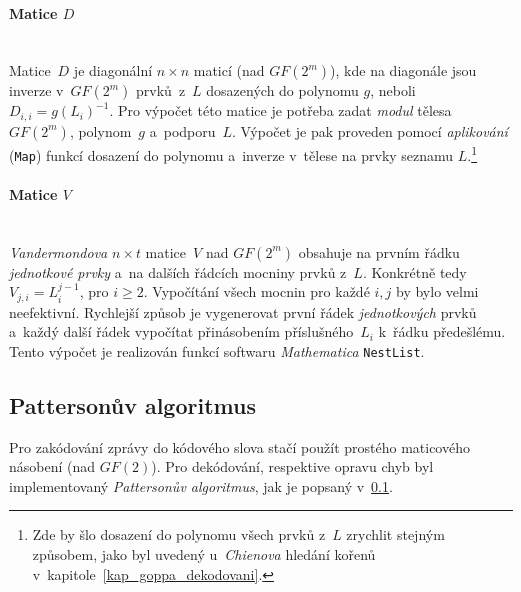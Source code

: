 \documentclass[thesis=M,czech,hidelinks]{FITthesis}[2012/06/26]
\newcommand{\0}{{\textcolor[gray]{0.75}{0}}}
\begin{document}
\paragraph{Matice $D$} \hfil \\
Matice~$D$ je diagonální $n \times n$ maticí (nad $GF(2^m)$), kde na diagonále
jsou inverze v~$GF(2^m)$ prvků~z~$L$ dosazených do polynomu $g$, neboli $D_{i,i}
= g(L_i)^{-1}$. Pro výpočet této matice je potřeba zadat \emph{modul} tělesa
$GF(2^m)$, polynom~$g$ a~podporu~$L$. Výpočet je pak proveden pomocí
\emph{aplikování} (\texttt{Map}) funkcí dosazení do polynomu a~inverze
v~tělese na prvky seznamu $L$.\footnote{
    Zde by šlo dosazení do polynomu všech prvků z~$L$ zrychlit stejným způsobem,
    jako byl uvedený u~\emph{Chienova} hledání kořenů
    v~kapitole~\ref{kap_goppa_dekodovani}.
}


\paragraph{Matice $V$} \hfil \\
\emph{Vandermondova} $n \times t$ matice~$V$ nad $GF(2^m)$ obsahuje na prvním
řádku \emph{jednotkové prvky} a~na dalších řádcích mocniny prvků z~$L$.
Konkrétně tedy $V_{j,i} = L_i^{j-1}$, pro $i\geq 2$. Vypočítání všech mocnin
pro každé $i,j$ by bylo velmi neefektivní. Rychlejší způsob je vygenerovat první
řádek \emph{jednotkových} prvků a~každý další řádek vypočítat přinásobením
příslušného~$L_i$ k~řádku předešlému. Tento výpočet je realizován funkcí
softwaru \emph{Mathematica} \texttt{NestList}.


\subsection{Pattersonův algoritmus}\label{kap_patterson}

Pro zakódování zprávy do kódového slova stačí použít prostého maticového
násobení (nad $GF(2)$). Pro dekódování, respektive opravu chyb byl
implementovaný \emph{Pattersonův algoritmus}, jak je popsaný
v~\ref{kap_patterson}.
\end{document}
